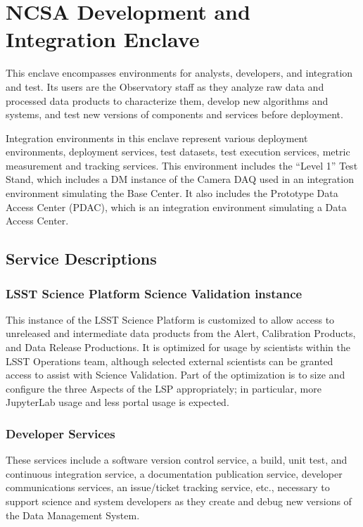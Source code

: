 \documentclass[DM,toc]{lsstdoc}
\begin{document}
\section{NCSA Development and Integration Enclave}\label{ncsa-development-integration-enclave}

This enclave encompasses environments for analysts, developers, and
integration and test. Its users are the Observatory staff as they
analyze raw data and processed data products to characterize them,
develop new algorithms and systems, and test new versions of components
and services before deployment.

Integration environments in this enclave represent various deployment environments, deployment services, test datasets, test execution services, metric measurement and tracking services.
This environment includes the ``Level 1'' Test Stand, which includes a DM instance of the Camera DAQ used in an integration environment simulating the Base Center.
It also includes the Prototype Data Access Center (PDAC), which is an integration environment simulating a Data Access Center.

\subsection{Service Descriptions}\label{ncsa-dev-int-service-descriptions}

\subsubsection{LSST Science Platform Science Validation
instance}\label{lsst-science-platform-science-validation-instance}

This instance of the LSST Science Platform is customized to allow access
to unreleased and intermediate data products from the Alert, Calibration
Products, and Data Release Productions. It is optimized for usage by
scientists within the LSST Operations team, although selected external
scientists can be granted access to assist with Science Validation. Part
of the optimization is to size and configure the three Aspects of the
LSP appropriately; in particular, more JupyterLab usage and less portal
usage is expected.

\subsubsection{Developer Services}\label{developer-services}

These services include a software version control service, a build, unit test, and continuous integration service, a documentation publication service, developer communications services, an issue/ticket tracking service, etc., necessary to support science and system developers as they create and debug new versions of the Data Management System.
\end{document}
